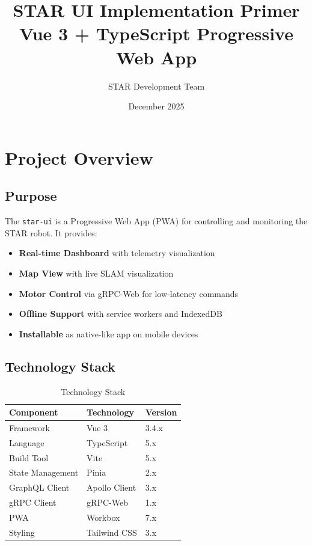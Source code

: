 \documentclass[11pt,letterpaper]{article}
\title{\textbf{STAR UI Implementation Primer}\\[0.5cm]
\large Vue 3 + TypeScript Progressive Web App}
\author{STAR Development Team}
\date{December 2025}
\begin{document}
\maketitle
\tableofcontents
\newpage

\section{Project Overview}

\subsection{Purpose}

The \texttt{star-ui} is a Progressive Web App (PWA) for controlling and monitoring the STAR robot. It provides:

\begin{itemize}
    \item \textbf{Real-time Dashboard} with telemetry visualization
    \item \textbf{Map View} with live SLAM visualization
    \item \textbf{Motor Control} via gRPC-Web for low-latency commands
    \item \textbf{Offline Support} with service workers and IndexedDB
    \item \textbf{Installable} as native-like app on mobile devices
\end{itemize}

\subsection{Technology Stack}

\begin{table}[H]
\centering
\begin{tabular}{|l|l|l|}
\hline
\textbf{Component} & \textbf{Technology} & \textbf{Version} \\
\hline
Framework & Vue 3 & 3.4.x \\
Language & TypeScript & 5.x \\
Build Tool & Vite & 5.x \\
State Management & Pinia & 2.x \\
GraphQL Client & Apollo Client & 3.x \\
gRPC Client & gRPC-Web & 1.x \\
PWA & Workbox & 7.x \\
Styling & Tailwind CSS & 3.x \\
\hline
\end{tabular}
\caption{Technology Stack}
\end{table}
\end{document}
